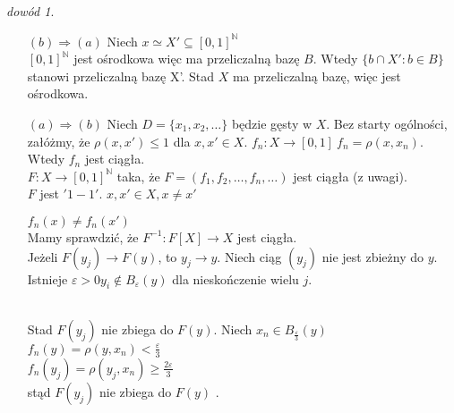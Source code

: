 \documentclass[twoside,10pt]{article}
\theoremstyle{definition}
\theoremstyle{definition}
\theoremstyle{definition}
\theoremstyle{definition}
\theoremstyle{remark}
\newtheorem*{dd}{dowód}
\theoremstyle{definition}
\theoremstyle{definition}
\theoremstyle{definition}
\theoremstyle{definition}
\theoremstyle{definition}
\theoremstyle{definition}
\begin{document}
\begin{dd} \hfill
    \begin{itemize} 
        \item[$(b) \Rightarrow (a)$] Niech $x \simeq X' \subseteq [0,1]^\mathbb{N}$ \\ 
            $[0,1]^\mathbb{N}$ jest ośrodkowa więc ma przeliczalną bazę $B$.
            Wtedy $ \{ b \cap X' : b \in B \}$ stanowi przeliczalną bazę X'. 
            Stad $X$ ma przeliczalną bazę, więc jest ośrodkowa. 
        \item[$(a) \Rightarrow (b)$] Niech $D = \{x_1,x_2,\ldots\}$ będzie gęsty w $X$. 
            Bez starty ogólności, załóżmy, że $\rho (x,x') \le 1$ dla $x,x' \in X$.
            $f_n : X \to [0,1] \ f_n = \rho (x,x_n)$. Wtedy $f_n$ jest ciągła. \\ 
            $ F: X \to [0,1]^\mathbb{N}$ taka, że $F = (f_1,f_2,\ldots,f_n,\ldots)$ jest ciągła (z uwagi). \\
            $F$ jest $'1-1'$. $x,x' \in X, x \neq x'$ \\ 
            $f_n(x) \neq f_n (x')$ \\ 
            Mamy sprawdzić, że $F^{-1} : F[X] \to X$ jest ciągła. \\
            Jeżeli $F(y_j) \to F(y)$, to $y_j \to y$.
            Niech ciąg $(y_j)$ nie jest zbieżny do $y$. Istnieje $\varepsilon > 0 
            y_i \notin B_\varepsilon (y)$ dla nieskończenie wielu $j$. \\ 
             \\ 
            Stad $F(y_j)$ nie zbiega do $F(y)$. Niech $x_n \in B_{\frac{\varepsilon}{3}} (y)$ \\
            $f_n (y) = \rho(y,x_n) < \frac{\varepsilon}{3}$ \\ 
            $f_n (y_j) = \rho(y_j,x_n) \ge \frac{2\varepsilon}{3}$ \\ 
            stąd $F(y_j)$ nie zbiega do $F(y)$ \lightning.
    \end{itemize} 
\end{dd} 
\end{document}
